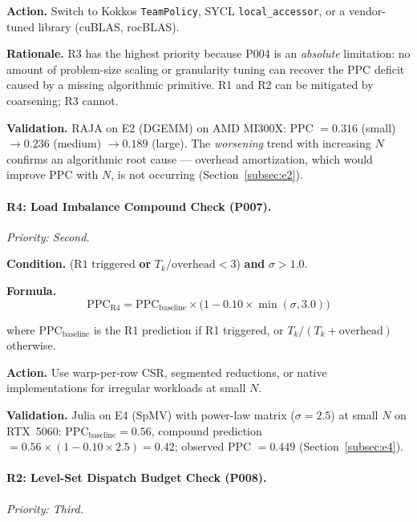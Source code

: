 \noindent\textbf{Action.}
Switch to Kokkos \texttt{TeamPolicy}, SYCL \texttt{local\_accessor}, or a
vendor-tuned library (cuBLAS, rocBLAS).

\noindent\textbf{Rationale.}
R3 has the highest priority because P004 is an \emph{absolute} limitation:
no amount of problem-size scaling or granularity tuning can recover the PPC
deficit caused by a missing algorithmic primitive. R1 and R2 can be mitigated
by coarsening; R3 cannot.

\noindent\textbf{Validation.}
RAJA on E2 (DGEMM) on AMD MI300X: PPC $= 0.316$ (small) $\rightarrow 0.236$
(medium) $\rightarrow 0.189$ (large). The \emph{worsening} trend with
increasing $N$ confirms an algorithmic root cause --- overhead amortization,
which would improve PPC with $N$, is not occurring
(Section~\ref{subsec:e2}).

\paragraph{R4: Load Imbalance Compound Check (P007).}
\textit{Priority: Second.}

\noindent\textbf{Condition.}
($\text{R1 triggered}$ \textbf{or} $T_k / \text{overhead} < 3$)
\textbf{and} $\sigma > 1.0$.

\noindent\textbf{Formula.}
\begin{equation}
    \text{PPC}_{\text{R4}} = \text{PPC}_{\text{baseline}} \times
    \bigl(1 - 0.10 \times \min(\sigma, 3.0)\bigr)
    \label{eq:r4}
\end{equation}

\noindent where $\text{PPC}_{\text{baseline}}$ is the R1 prediction if R1
triggered, or $T_k / (T_k + \text{overhead})$ otherwise.

\noindent\textbf{Action.}
Use warp-per-row CSR, segmented reductions, or native implementations for
irregular workloads at small $N$.

\noindent\textbf{Validation.}
Julia on E4 (SpMV) with power-law matrix ($\sigma = 2.5$) at small $N$ on
RTX~5060: $\text{PPC}_{\text{baseline}} = 0.56$, compound prediction
$= 0.56 \times (1 - 0.10 \times 2.5) = 0.42$; observed PPC $= 0.449$
(Section~\ref{subsec:e4}).

\paragraph{R2: Level-Set Dispatch Budget Check (P008).}
\textit{Priority: Third.}

